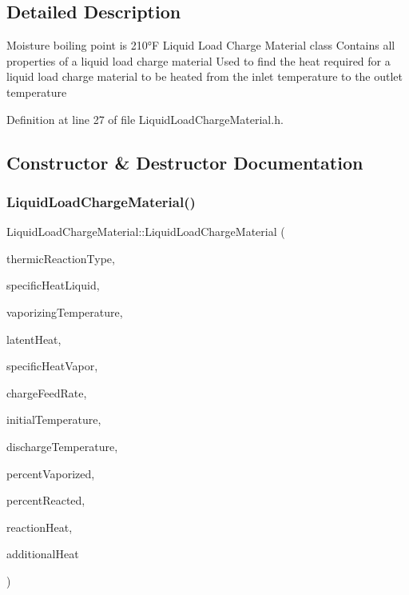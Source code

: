 \subsection{Detailed Description}
Moisture boiling point is 210°F Liquid Load Charge Material class Contains all properties of a liquid load charge material Used to find the heat required for a liquid load charge material to be heated from the inlet temperature to the outlet temperature 

Definition at line 27 of file Liquid\+Load\+Charge\+Material.\+h.



\subsection{Constructor \& Destructor Documentation}
\mbox{\label{class_liquid_load_charge_material_ab6b2ef342701227c60dc380f5a576085}} 
\subsubsection{\texorpdfstring{Liquid\+Load\+Charge\+Material()}{LiquidLoadChargeMaterial()}}
{\footnotesize\ttfamily Liquid\+Load\+Charge\+Material\+::\+Liquid\+Load\+Charge\+Material (\begin{DoxyParamCaption}\item[{const \hyperlink{class_load_charge_material_a51d4263e865a5d86236622dd3fe23fd1}{Load\+Charge\+Material\+::\+Thermic\+Reaction\+Type}}]{thermic\+Reaction\+Type,  }\item[{const double}]{specific\+Heat\+Liquid,  }\item[{const double}]{vaporizing\+Temperature,  }\item[{const double}]{latent\+Heat,  }\item[{const double}]{specific\+Heat\+Vapor,  }\item[{const double}]{charge\+Feed\+Rate,  }\item[{const double}]{initial\+Temperature,  }\item[{const double}]{discharge\+Temperature,  }\item[{const double}]{percent\+Vaporized,  }\item[{const double}]{percent\+Reacted,  }\item[{const double}]{reaction\+Heat,  }\item[{const double}]{additional\+Heat }\end{DoxyParamCaption})\hspace{0.3cm}{\ttfamily [inline]}}

